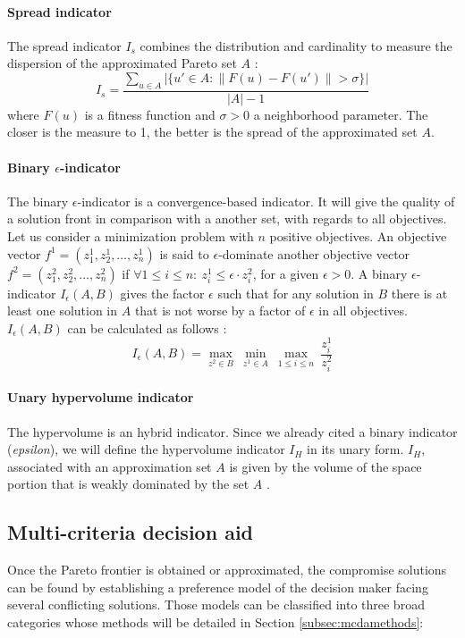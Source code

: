 \paragraph{Spread indicator}

The spread indicator $I_s$ combines the distribution and cardinality to measure the dispersion of the approximated Pareto set $A$ \cite{talbi09}:
\begin{equation}
I_s = \frac{\sum_{u \in A}|\{u' \in A: \|F(u)-F(u')\|>\sigma\}|}{|A|-1}
\end{equation}
where $F(u)$ is a fitness function and $\sigma > 0$ a neighborhood parameter. The closer is the measure to 1, the better is the spread of the approximated set $A$.

\paragraph{Binary $\epsilon$-indicator}
The binary $\epsilon$-indicator is a convergence-based indicator. It will give the quality of a solution front in comparison with a another set, with regards to all objectives. Let us consider a minimization problem with $n$ positive objectives. An objective vector $f^1 = (z_1^1, z_2^1, \dots, z_n^1)$ is said to $\epsilon$-dominate another objective vector $f^2 = (z_1^2, z_2^2, \dots, z_n^2)$ if $\forall 1 \leq i \leq n : \: z_i^1 \leq \epsilon \cdot z_i^2$, for a given $\epsilon > 0$. A binary $\epsilon$-indicator $I_\epsilon(A,B)$ gives the factor $\epsilon$ such that for any solution in $B$ there is at least one solution in $A$ that is not worse by a factor of $\epsilon$ in all objectives. $I_\epsilon(A,B)$ can be calculated as follows \cite{1197687}:
\begin{equation}
I_\epsilon(A,B) = \max\limits_{z^2 \in B} \: \min_{z^1 \in A} \: \max_{1 \leq i \leq n} \: \frac{z_i^1}{z_i^2}
\end{equation}

\paragraph{Unary hypervolume indicator}
The hypervolume is an hybrid indicator. Since we already cited a binary indicator (\textit{epsilon}), we will define the hypervolume indicator $I_H$ in its unary form. $I_H$, associated with an approximation set $A$ is given by the volume of the space portion that is weakly dominated by the set $A$ \cite{talbi09}.

\subsection{Multi-criteria decision aid}
\label{subsec:mcda}
Once the Pareto frontier is obtained or approximated, the compromise solutions can be found by establishing a preference model of the decision maker facing several conflicting solutions. Those models can be classified into three broad categories \cite{Vin92, beltstew} whose methods will be detailed in Section \ref{subsec:mcdamethods}:

